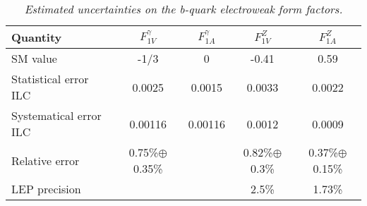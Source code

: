 \begin{table}
        \begin{center}
        \begin{tabular}{l c c c c}
        \hline
	Quantity  				 & $F_{1V}^\gamma$ & $F_{1A}^\gamma$ &  $F_{1V}^Z$ &  $F_{1A}^Z$\\
	\hline
	SM value  				 & -1/3   			    & 0				  & -0.41		& 0.59\\
	Statistical error ILC    & 0.0025   			& 0.0015		  & 0.0033 		& 0.0022\\
	Systematical error ILC   & 0.00116  			& 0.00116		  & 0.0012 		& 0.0009\\
	Relative error			 & 0.75\%$\oplus$0.35\%	& 				  & 0.82\%$\oplus$0.3\%		& 0.37\%$\oplus$0.15\%\\
	
	LEP precision 			 & 						&				  & 2.5\% 		& 1.73\% \\
        \hline
        \end{tabular}
        \end{center}
        \caption{\sl Estimated uncertainties on the b-quark electroweak form factors.}
        \label{table:fffinal}
\end{table}
